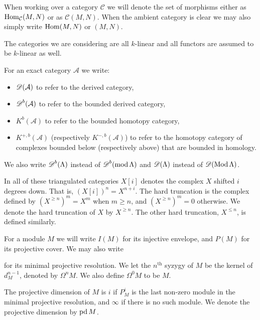 
When working over a category $\mathcal C$ we will denote the set of morphisms either as $\operatorname{Hom}_{\mathcal C}(M, N)$ or as $\mathcal C(M,N)$. When the ambient category is clear we may also simply write $\operatorname{Hom}(M, N)$ or $(M, N)$.

The categories we are considering are all $k$-linear and all functors are assumed to be $k$-linear as well.


For an exact category $\mathcal A$ we write:
\begin{itemize}
	\item $\operatorname{\mathscr{D}}(\mathcal A)$ to refer to the derived category, 
	\item $\operatorname{\mathscr{D}}^b(\mathcal A)$ to refer to the bounded derived category, 
	\item $K^b(\mathcal A)$ to refer to the bounded homotopy category, 
	\item $K^{+,b}(\mathcal A)$ (respectively $K^{-,b}(\mathcal A)$) to refer to the homotopy category of complexes bounded below (respectively above) that are bounded in homology.
\end{itemize}
We also write $\operatorname{\mathscr{D}}^b(\Lambda)$ instead of $\operatorname{\mathscr{D}}^b(\operatorname{mod}\Lambda)$ and $\operatorname{\mathscr{D}}(\Lambda)$ instead of $\operatorname{\mathscr{D}}(\operatorname{Mod}\Lambda)$. 

In all of these triangulated categories $X[i]$ denotes the complex $X$ shifted $i$ degrees down. That is, $(X[i])^n = X^{n+i}$. The hard truncation is the complex defined by $(X^{\geq n})^m = X^m$ when $m \geq n$, and $(X^{\geq n})^m = 0$ otherwise. We denote the hard truncation of $X$ by $X^{\geq n}$. The other hard truncation, $X^{\leq n}$, is defined similarly. 


For a module $M$ we will write $I(M)$ for its injective envelope, and $P(M)$ for its projective cover. We may also write 
\begin{center}
\end{center} 
for its minimal projective resolution. We let the $n^\text{th}$ syzygy of $M$ be the kernel of $d_M^{n-1}$, denoted by $\Omega^n M$. We also define $\Omega^0 M$ to be $M$.

The projective dimension of $M$ is $i$ if $P_M^i$ is the last non-zero module in the minimal projective resolution, and $\infty$ if there is no such module. We denote the projective dimension by $\operatorname{pd} M$.

